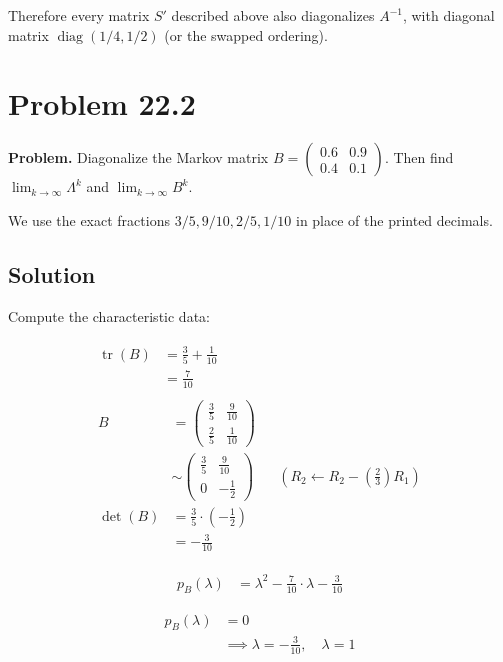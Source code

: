 \documentclass[11pt]{article}
\begin{document}
Therefore every matrix \(S'\) described above also diagonalizes \(A^{-1}\), with diagonal matrix \(\operatorname{diag}(1/4,1/2)\) (or the swapped ordering).

\newpage
\section*{Problem 22.2}
\textbf{Problem.} Diagonalize the Markov matrix \(B=\begin{pmatrix}0.6&0.9\\0.4&0.1\end{pmatrix}\). Then find \(\lim_{k\to\infty}\Lambda^k\) and \(\lim_{k\to\infty}B^k\).

We use the exact fractions \(3/5,9/10,2/5,1/10\) in place of the printed decimals.

\subsection*{Solution}
Compute the characteristic data:

\begin{align*}\begin{aligned}\operatorname{tr}\left(B\right) &= \frac{3}{5} + \frac{1}{10} \\ &= \frac{7}{10}\end{aligned} \\
\begin{aligned}B &= \begin{pmatrix}\frac{3}{5} & \frac{9}{10} \\ \frac{2}{5} & \frac{1}{10}\end{pmatrix} \\
&\sim \begin{pmatrix}\frac{3}{5} & \frac{9}{10} \\ 0 & -\frac{1}{2}\end{pmatrix} && \left(R_{2}\leftarrow R_{2}-\left(\frac{2}{3}\right)R_{1}\right) \\
\det\left(B\right) &= \frac{3}{5}\cdot \left(-\frac{1}{2}\right) \\
&= -\frac{3}{10}\end{aligned}\end{align*}

\[\begin{aligned}p_{B}\left(\lambda\right) &= \lambda^{2} - \frac{7}{10} \cdot \lambda - \frac{3}{10}\end{aligned}\]

\[\begin{aligned}p_{B}\left(\lambda\right) &= 0 \\ &\implies \lambda = -\frac{3}{10},\quad \lambda = 1\end{aligned}\]
\end{document}
